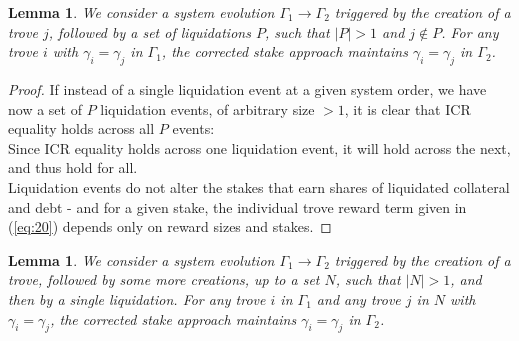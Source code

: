 \documentclass[reqno]{article}
\newtheorem{lemma}[theorem]{Lemma}
\begin{document}
\begin{lemma} \label{result:2} We consider a system evolution $\Gamma_1 \rightarrow \Gamma_2$ triggered by the creation of a trove $j$, followed by a set of liquidations $P$, such that $|P| > 1$ and $j \notin P$. For any trove $i$ with $\gamma_i = \gamma_j$ in $\Gamma_1$, the corrected stake approach maintains $\gamma_i = \gamma_j$ in $\Gamma_2$.
\end{lemma}

\begin{proof}
If instead of a single liquidation event at a given system order, we have now a set of $P$ liquidation events, of arbitrary size $> 1$, it is clear that ICR equality holds across all $P$ events:\\

Since ICR equality holds across one liquidation event, it will hold across the next, and thus hold for all.\\

Liquidation events do not alter the stakes that earn shares of liquidated collateral and debt - and for a given stake, the individual trove reward term given in (\ref{eq:20}) depends only on reward sizes and stakes.
\end{proof}

\begin{lemma} \label{result:3}
  We consider a system evolution $\Gamma_1 \rightarrow \Gamma_2$ triggered by the creation of a trove, followed by some more creations, up to a set $N$, such that $|N| > 1$, and then by a single liquidation. For any trove $i$ in $\Gamma_1$ and any trove $j$ in $N$ with $\gamma_i = \gamma_j$, the corrected stake approach maintains $\gamma_i = \gamma_j$ in $\Gamma_2$.
\end{lemma}
\end{document}
